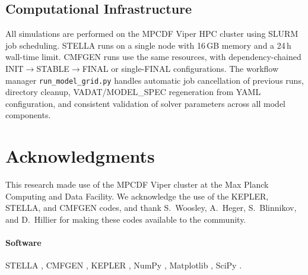 \documentclass[11pt, a4paper]{article}
\begin{document}
\subsection{Computational Infrastructure}
\label{subsec:infrastructure}

All simulations are performed on the MPCDF Viper HPC cluster using SLURM
job scheduling.  STELLA runs on a single node with 16\,GB memory and a
24\,h wall-time limit.  CMFGEN runs use the same resources, with
dependency-chained INIT$\to$STABLE$\to$FINAL or single-FINAL
configurations.  The workflow manager \texttt{run\_model\_grid.py}
handles automatic job cancellation of previous runs, directory cleanup,
VADAT/MODEL\_SPEC regeneration from YAML configuration, and consistent
validation of solver parameters across all model components.

\section*{Acknowledgments}
This research made use of the MPCDF Viper cluster at the Max Planck
Computing and Data Facility.  We acknowledge the use of the KEPLER,
STELLA, and CMFGEN codes, and thank S.\ Woosley, A.\ Heger,
S.\ Blinnikov, and D.\ Hillier for making these codes available to the
community.

\paragraph{Software}
STELLA \citep{Blinnikov1998, Blinnikov2000, Blinnikov2006},
CMFGEN \citep{Hillier1998, HillierDessart2012, Dessart2015},
KEPLER \citep{WoosleyHeger2007},
NumPy \citep{Harris2020},
Matplotlib \citep{Hunter2007},
SciPy \citep{Virtanen2020}.



\end{document}
